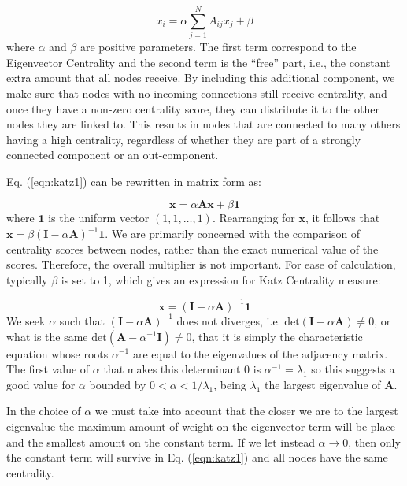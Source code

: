 \begin{equation}
\label{eqn:katz1}
    x_i= \alpha\sum_{j=1}^{N}A_{ij}x_j + \beta
\end{equation}
where $\alpha$ and $\beta$ are positive parameters. The first term correspond to the Eigenvector Centrality and the second term is the “free” part, i.e., the constant extra amount that all nodes receive. By including this additional component, we make sure that nodes with no incoming connections still receive centrality, and once they have a non-zero centrality score, they can distribute it to the other nodes they are linked to. This results in nodes that are connected to many others having a high centrality, regardless of whether they are part of a strongly connected component or an out-component.

Eq. (\ref{eqn:katz1}) can be rewritten in matrix form as:

\begin{equation}
\label{eqn:katz2}
    \mathbf{x}= \alpha\mathbf{Ax} + \beta\mathbf{1}
\end{equation}
where $\mathbf{1}$ is the uniform vector $(1,1,\dots,1)$. Rearranging for $\mathbf{x}$, it follows that $\mathbf{x} = \beta (\mathbf{I}-\alpha\mathbf{A})^{-1}\mathbf{1}$.
We are primarily concerned with the comparison of centrality scores between nodes, rather than the exact numerical value of the scores. Therefore, the overall multiplier is not important. For ease of calculation, typically $\beta$ is set to 1, which gives an expression for Katz Centrality measure:

\begin{equation}
\label{eqn:katz3}
    \mathbf{x} = (\mathbf{I}-\alpha\mathbf{A})^{-1}\mathbf{1}
\end{equation}
We seek $\alpha$ such that $(\mathbf{I}-\alpha\mathbf{A})^{-1}$ does not diverges, i.e. $\text{det}(\mathbf{I}-\alpha\mathbf{A})\neq 0$, or what is the same $\text{det}(\mathbf{A}-\alpha^{-1}\mathbf{I})\neq 0$, that it is simply the characteristic equation whose roots $\alpha^{-1}$ are equal to the eigenvalues of the adjacency matrix. The first value of $\alpha$ that makes this determinant $0$ is $\alpha^{-1}=\lambda_1$ so this suggests a good value for $\alpha$ bounded by $0 < \alpha < 1/\lambda_1 $, being $\lambda_1$ the largest eigenvalue of $\mathbf{A}$. 

In the choice of $\alpha$ we must take into account that the closer we are to the largest eigenvalue the maximum amount of weight on the eigenvector term will be place and the smallest amount on the constant term. If we let instead $\alpha\to 0$, then only the constant term will survive in Eq. (\ref{eqn:katz1}) and all nodes have the same centrality.

